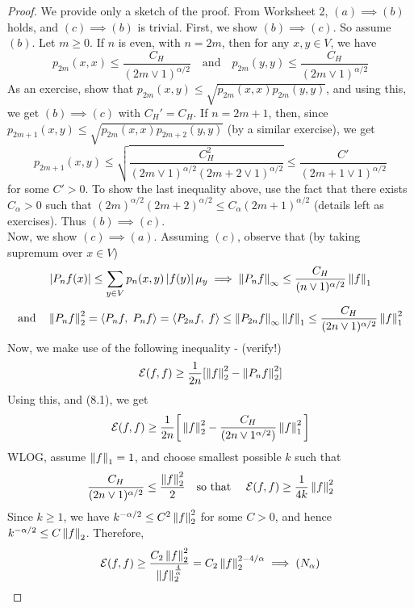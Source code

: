 \documentclass[main]{subfiles}
\begin{document}
\begin{proof}
	We provide only a sketch of the proof. From Worksheet 2, $(a) \implies (b)$  holds, and $(c) \implies (b)$ is trivial. First, we show $(b) \implies (c)$. So assume $(b)$.
	Let $m\ge0$. If $n$ is even, with $n=2m$, then for any $x,y\in V$, we have
	\[p_{2m}(x,x)\le\frac{C_H}{(2m\lor 1)^{\alpha/2}}\quad\text{and}\quad p_{2m}(y,y)\le\frac{C_H}{(2m\lor 1)^{\alpha/2}}\]
	As an exercise, show that $p_{2m}(x,y)\le\sqrt{p_{2m}(x,x)p_{2m}(y,y)}$, and using this, we get $(b) \implies (c)$ with $C_H'=C_H$. If $n=2m+1$, then, since $p_{2m+1}(x,y)\le\sqrt{p_{2m}(x,x)p_{2m+2}(y,y)}$ (by a similar exercise), we get \[p_{2m+1}(x,y)\le\sqrt{\frac{C_H^2}{(2m\lor 1)^{\alpha/2}(2m+2\lor 1)^{\alpha/2}}}\le \frac{C'}{(2m+1\lor 1)^{\alpha/2}}\] for some $C'>0$. To show the last inequality above, use the fact that there exists $C_{\alpha}>0$ such that $(2m)^{\alpha/2}(2m+2)^{\alpha/2}\le C_{\alpha}(2m+1)^{\alpha/2}$ (details left as exercises). Thus $(b)\implies (c)$.\\
	Now, we show $(c)\implies (a)$. Assuming $(c)$, observe that (by taking supremum over $x\in V$) \[\left\lvert P_nf(x)\right\rvert \le \sum_{y\in V}p_n(x,y)\left\lvert f(y)\right\rvert\mu_y\implies \left\lVert P_nf\right\rVert_{\infty} \le \frac{C_H}{(n\lor 1)^{\alpha/2}}\left\lVert f\right\rVert_{1}\]
	\begin{equation} \label{eq:1}
		\text{and\quad}\left\lVert P_nf\right\rVert_{2}^2=\left\langle P_nf,\;P_nf\right\rangle=\left\langle P_{2n}f,\;f\right\rangle\le\left\lVert P_{2n}f\right\rVert_{\infty}\left\lVert f\right\rVert_{1}\le \frac{C_H}{(2n\lor 1)^{\alpha/2}}\left\lVert f\right\rVert_{1}^2
	\end{equation}
	Now, we make use of the following inequality - (verify!)
	\[\mathcal E(f, f)\ge \frac{1}{2n}[\left\lVert f\right\rVert_{2}^2-\left\lVert P_nf\right\rVert_{2}^2]\]
	Using this, and (8.1), we get
	\[\mathcal E(f,f) \ge \frac{1}{2n}\bigg[\left\lVert f\right\rVert_{2}^2-\frac{C_H}{(2n\lor 1^{\alpha/2})}\left\lVert f\right\rVert_{1}^2\bigg]\]
	WLOG, assume $\left\lVert f\right\rVert_{1}=1$, and choose smallest possible $k$ such that
	\[\frac{C_H}{(2n\lor 1)^{\alpha/2}}\le\frac{\left\lVert f\right\rVert_{2}^2}{2}\text{\quad so that \quad}\mathcal E(f,f)\ge\frac{1}{4k}\left\lVert f\right\rVert_{2}^2\]
	Since $k\ge 1$, we have $k^{-\alpha/2}\le C^2\left\lVert f\right\rVert_{2}^2$ for some $C>0$, and hence $k^{-\alpha/2}\le C\left\lVert f\right\rVert_{2}$. Therefore,
	\[\mathcal E(f,f)\ge \frac{C_2\left\lVert f\right\rVert_{2}^2}{\left\lVert f\right\rVert_{2}^{\frac{4}{\alpha}}} = C_2\left\lVert f\right\rVert_{2}^{2-4/\alpha}\implies (N_{\alpha})\]
\end{proof}
\end{document}
